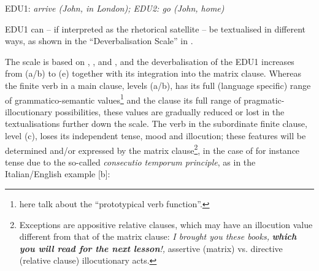\documentclass[output=paper]{LSP/langsci}
\begin{document}
\ea\label{ex:korzen:2}
EDU1: \textit{arrive (John, in London); EDU2: go (John, home)}
\z

EDU1 can -- if interpreted as the rhetorical satellite -- be textualised in different ways, as shown in the ``Deverbalisation Scale'' in . 

\begin{table}
\caption{The Deverbalisation Scale}
\label{tab:korzen:6}
\end{table}

The scale is based on \citet{Hopper1984}, \citet{Lehmann1988}, and \citet{Korzen2007a,Korzen2009}, and the deverbalisation of the EDU1 increases from (a/b) to (e) together with its integration into the matrix clause. Whereas the finite verb in a main clause, levels (a/b), has its full (language specific) range of grammatico-semantic values\footnote{\citet[708]{Hopper1984} here talk about the ``prototypical verb function''.} and the clause its full range of pragmatic-illocutionary possibilities, these values are gradually reduced or lost in the textualisations further down the scale. The verb in the subordinate finite clause, level (c), loses its independent tense, mood and illocution; these features will be determined and/or expressed by the matrix clause\footnote{Exceptions are appositive relative clauses, which may have an illocution value different from that of the matrix clause: \textit{I brought you these books, }\textbf{\textit{which you will read for the next lesson}}\textit{!, }assertive (matrix) vs. directive (relative clause) illocutionary acts.}, in the case of for instance tense due to the so-called \textit{consecutio temporum principle}, as in the Italian/English example [b]:
\end{document}
